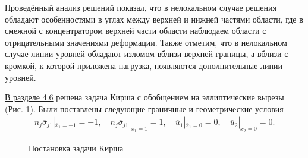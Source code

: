 
Проведённый анализ решений показал, что в нелокальном случае решения обладают особенностями в углах между верхней и нижней частями области, где в смежной с концентратором верхней части области наблюдаем области с отрицательными значениями деформации. Также отметим, что в нелокальном случае линии уровней обладают изломом вблизи верхней границы, а вблизи с кромкой, к которой приложена нагрузка, появляются дополнительные линии уровней.

\underline{В разделе 4.6} решена задача Кирша с обобщением на эллиптические вырезы (Рис. \ref{fig:KirshProblem}). Были поставлены следующие граничные и геометрические условия
\begin{gather*}
	n_j \overline{\sigma}_{j1} |_{\overline{x}_1 = -1} = -1,
	\quad
	n_j \overline{\sigma}_{j1} |_{\overline{x}_1 = 1} = 1,
	\quad
	\overline{u}_1 |_{\overline{x}_1 = 0} = 0,
	\quad
	\overline{u}_2 |_{\overline{x}_2 = 0} = 0.
\end{gather*}

\begin{figure}[ht]
    \caption{Постановка задачи Кирша}
    \label{fig:KirshProblem}
\end{figure}

